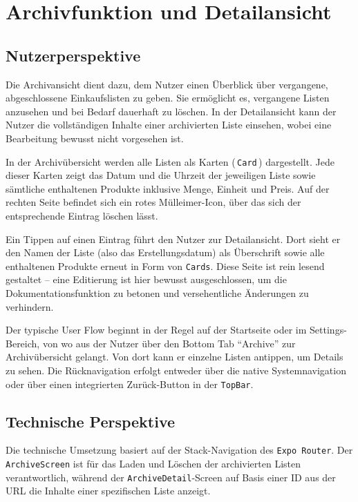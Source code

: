 \section{Archivfunktion und Detailansicht}

\subsection{Nutzerperspektive}

Die Archivansicht dient dazu, dem Nutzer einen Überblick über vergangene, abgeschlossene Einkaufslisten zu geben. Sie ermöglicht es, vergangene Listen anzusehen und bei Bedarf dauerhaft zu löschen. In der Detailansicht kann der Nutzer die vollständigen Inhalte einer archivierten Liste einsehen, wobei eine Bearbeitung bewusst nicht vorgesehen ist.

In der Archivübersicht werden alle Listen als Karten (\,\texttt{Card}\,) dargestellt. Jede dieser Karten zeigt das Datum und die Uhrzeit der jeweiligen Liste sowie sämtliche enthaltenen Produkte inklusive Menge, Einheit und Preis. Auf der rechten Seite befindet sich ein rotes Mülleimer-Icon, über das sich der entsprechende Eintrag löschen lässt.

Ein Tippen auf einen Eintrag führt den Nutzer zur Detailansicht. Dort sieht er den Namen der Liste (also das Erstellungsdatum) als Überschrift sowie alle enthaltenen Produkte erneut in Form von \texttt{Cards}. Diese Seite ist rein lesend gestaltet – eine Editierung ist hier bewusst ausgeschlossen, um die Dokumentationsfunktion zu betonen und versehentliche Änderungen zu verhindern.

Der typische User Flow beginnt in der Regel auf der Startseite oder im Settings-Bereich, von wo aus der Nutzer über den Bottom Tab \enquote{Archive} zur Archivübersicht gelangt. Von dort kann er einzelne Listen antippen, um Details zu sehen. Die Rücknavigation erfolgt entweder über die native Systemnavigation oder über einen integrierten Zurück-Button in der \texttt{TopBar}.

\subsection{Technische Perspektive}

Die technische Umsetzung basiert auf der Stack-Navigation des \texttt{Expo Router}. Der \texttt{ArchiveScreen} ist für das Laden und Löschen der archivierten Listen verantwortlich, während der \texttt{ArchiveDetail}-Screen auf Basis einer ID aus der URL die Inhalte einer spezifischen Liste anzeigt.

